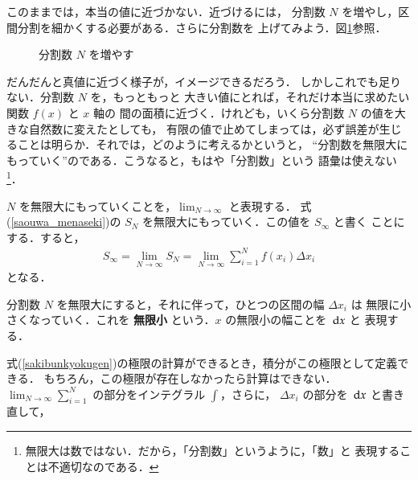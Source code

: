                 このままでは，本当の値に近づかない．近づけるには，
                分割数 $N$ を増やし，区間分割を細かくする必要がある．さらに分割数を
                上げてみよう．図\ref{fig:INTEG_KINJI_DTL}参照．
                    \begin{figure}[hbt]
                        \begin{center}
                            \caption{分割数 $N$ を増やす}
                            \label{fig:INTEG_KINJI_DTL}
                        \end{center}
                    \end{figure}

                だんだんと真値に近づく様子が，イメージできるだろう．
                しかしこれでも足りない．分割数 $N$ を，もっともっと
                大きい値にとれば，それだけ本当に求めたい関数 $f(x)$ と $x$ 軸の
                間の面積に近づく．けれども，いくら分割数 $N$ の値を大きな自然数に変えたとしても，
                有限の値で止めてしまっては，必ず誤差が生じることは明らか．それでは，どのように考えるかというと，
                “分割数を無限大にもっていく”のである．こうなると，もはや「分割数」という
                語彙は使えない
                    \footnote{
                        無限大は数ではない．だから，「分割数」というように，「数」と
                        表現することは不適切なのである．
                    }．

                $N$ を無限大にもっていくことを，$\displaystyle\lim_{N\rightarrow  \infty}$ と表現する．
                式(\ref{saouwa_menaseki})の $S_{N}$ を無限大にもっていく．この値を $S_{\infty}$ と書く
                ことにする．すると，
                    \begin{align}\label{sakibunkyokugen}
                        S_{\infty}=\lim_{N\rightarrow  \infty} S_{N}
                        =\lim_{N\rightarrow  \infty}\sum_{i=1}^{N} f(x_{i})\Delta x_{i}
                    \end{align}
                となる．

                分割数 $N$ を無限大にすると，それに伴って，ひとつの区間の幅 $\Delta x_{i}$ は
                無限に小さくなっていく．これを \textbf{無限小} という．$x$ の無限小の幅ことを $\,\mathrm{d} x$ と
                表現する．

                式(\ref{sakibunkyokugen})の極限の計算ができるとき，積分がこの極限として定義できる．
                もちろん，この極限が存在しなかったら計算はできない．
                $\displaystyle\lim_{N\rightarrow  \infty}\sum_{i=1}^{N}$ の部分をインテグラル $\displaystyle\int$，さらに，
                $\Delta x_{i}$ の部分を $\,\mathrm{d} x$ と書き直して，\\

